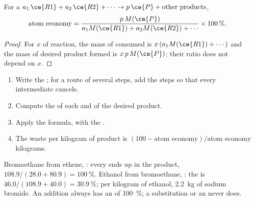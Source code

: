 \begin{proposition}\label{prop:g12:synthesis-strategy:atom-economy}
For a  $a_1\,\ce{R1} + a_2\,\ce{R2} + \cdots \rightarrow
p\,\ce{P} + \text{other products}$,
\[
  \text{atom economy} =
  \frac{p\,M(\ce{P})}{a_1 M(\ce{R1}) + a_2 M(\ce{R2}) + \cdots}
  \times 100\,\% .
\]
\end{proposition}

\begin{proof}
For $x$  of reaction, the mass of  consumed is
$x\,(a_1 M(\ce{R1}) + \cdots)$ and the mass of desired product formed is
$x\,p\,M(\ce{P})$; their ratio does not depend on $x$.
\end{proof}

\begin{method}\label{met:g12:synthesis-strategy:atom-economy}
\begin{enumerate}
  \item Write the ; for a route of several steps, add the
        steps so that every intermediate cancels.
  \item Compute the  of each  and of the desired
        product.
  \item Apply the formula, with the .
  \item The waste per kilogram of product is
        $(100 - \text{atom economy})/\text{atom economy}$ kilograms.
\end{enumerate}
\end{method}

\begin{example}\label{ex:g12:synthesis-strategy:compare}
Bromoethane from ethene, : every  ends up
in the product,  $108.9/(28.0 + 80.9) = \qty{100}{\percent}$.
Ethanol from bromoethane, : the
 is $46.0/(108.9 + 40.0) = \qty{30.9}{\percent}$; per
kilogram of ethanol, \qty{2.2}{kg} of sodium bromide. An addition always
has an  of \qty{100}{\percent}; a substitution or an
 never does.
\end{example}


